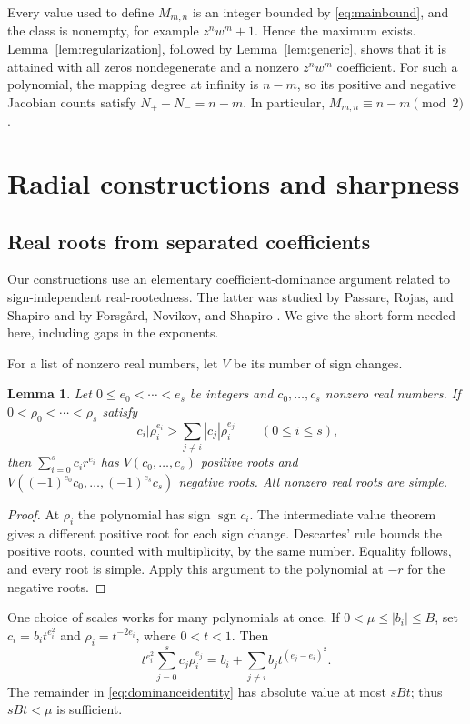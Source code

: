 \documentclass[a4paper]{amsart}
\newtheorem{lem}[thm]{Lemma}
\theoremstyle{remark}
\DeclareMathOperator{\sgn}{sgn}
\begin{document}
Every value used to define \(M_{m,n}\) is an integer bounded
by \eqref{eq:mainbound}, and the class is nonempty, for
example \(z^nw^m+1\). Hence the maximum exists.
Lemma~\ref{lem:regularization}, followed by
Lemma~\ref{lem:generic}, shows that it is attained with all
zeros nondegenerate and a nonzero \(z^nw^m\) coefficient.
For such a polynomial, the mapping degree at infinity is
\(n-m\), so its positive and negative Jacobian counts
satisfy \(N_+-N_-=n-m\).
In particular, \(M_{m,n}\equiv n-m\pmod2\).

\section{Radial constructions and sharpness}\label{sec:radial}

\subsection{Real roots from separated coefficients}
Our constructions use an elementary coefficient-dominance
argument related to sign-independent real-rootedness.
The latter was studied by Passare, Rojas, and Shapiro
\cite{PRS11} and by Forsg{\aa}rd, Novikov, and Shapiro
\cite[Proposition 1]{FNS17}. We give the short form needed
here, including gaps in the exponents.

For a list of nonzero real numbers, let \(V\) be its number
of sign changes.

\begin{lem}\label{lem:dominance}
Let \(0\le e_0<\cdots<e_s\) be integers and
\(c_0,\ldots,c_s\) nonzero real numbers.
If \(0<\rho_0<\cdots<\rho_s\) satisfy
\[
 |c_i|\rho_i^{e_i}>
 \sum_{j\ne i}|c_j|\rho_i^{e_j}\qquad(0\le i\le s),
\]
then \(\sum_{i=0}^s c_i r^{e_i}\) has
\(V(c_0,\ldots,c_s)\) positive roots and
\(V((-1)^{e_0}c_0,\ldots,(-1)^{e_s}c_s)\) negative roots.
All nonzero real roots are simple.
\end{lem}

\begin{proof}
At \(\rho_i\) the polynomial has sign \(\sgn c_i\).
The intermediate value theorem gives a different positive
root for each sign change. Descartes' rule bounds the
positive roots, counted with multiplicity, by the same
number. Equality follows, and every root is simple.
Apply this argument to the polynomial at \(-r\) for the
negative roots.
\end{proof}

One choice of scales works for many polynomials at once.
If \(0<\mu\le|b_i|\le B\), set \(c_i=b_it^{e_i^2}\)
and \(\rho_i=t^{-2e_i}\), where \(0<t<1\). Then
\begin{equation}\label{eq:dominanceidentity}
 t^{e_i^2}\sum_{j=0}^s c_j\rho_i^{e_j}
 =b_i+\sum_{j\ne i}b_jt^{(e_j-e_i)^2}.
\end{equation}
The remainder in \eqref{eq:dominanceidentity} has absolute
value at most \(sBt\); thus \(sBt<\mu\) is sufficient.
\end{document}

